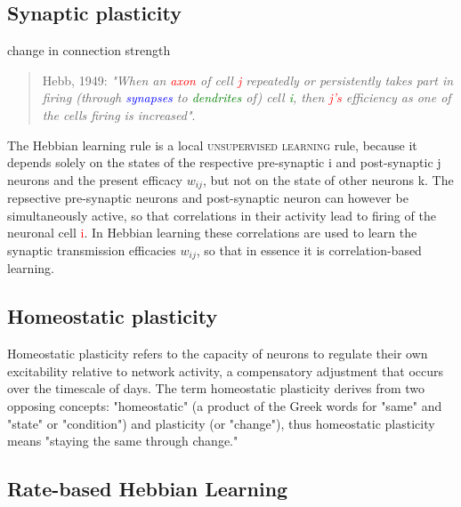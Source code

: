 \documentclass[11pt]{article}
\begin{document}
\subsection{Synaptic plasticity}
change in connection strength
\begin{quote}{Hebb, 1949:}
\textit{"When an \textcolor{red}{axon} of cell \textcolor{red}{j} repeatedly or persistently takes part in firing (through \textcolor{blue}{synapses} to \textcolor{green}{dendrites} of) cell \textcolor{green}{i}, then \textcolor{red}{j's} efficiency as one of the cells firing is increased"}.
\end{quote}
The Hebbian learning rule is a local \textsc{unsupervised learning} rule, because it depends solely on the states of the respective pre-synaptic i and post-synaptic j neurons and the present efficacy $w_{ij}$, but not on the state of other neurons k. The repsective pre-synaptic neurons and post-synaptic neuron can however be simultaneously active, so that correlations in their activity lead to firing of the neuronal cell \textcolor{red}{i}. In Hebbian learning these correlations are used to learn the synaptic transmission efficacies $w_{ij}$, so that in essence it is correlation-based learning.

\subsection{Homeostatic plasticity}
Homeostatic plasticity refers to the capacity of neurons to regulate their own excitability relative to network activity, a compensatory adjustment that occurs over the timescale of days. The term homeostatic plasticity derives from two opposing concepts: "homeostatic" (a product of the Greek words for "same" and "state" or "condition") and plasticity (or "change"), thus homeostatic plasticity means "staying the same through change."

\subsection{Rate-based Hebbian Learning}
\end{document}
